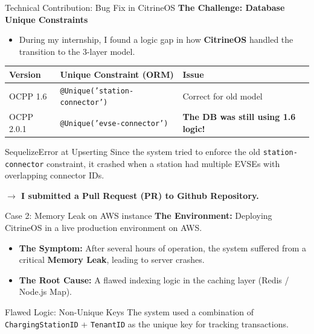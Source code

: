 \documentclass[11pt]{beamer}
\begin{document}
\begin{frame}{Technical Contribution: Bug Fix in CitrineOS}
    \textbf{The Challenge: Database Unique Constraints}
    \begin{itemize}
        \item During my internship, I found a logic gap in how \textbf{CitrineOS} handled the transition to the 3-layer model.
    \end{itemize}

    \begin{table}[]
        \small
        \begin{tabular}{l|l|l}
        \textbf{Version} & \textbf{Unique Constraint (ORM)} & \textbf{Issue} \\ \hline
        OCPP 1.6 & \texttt{@Unique('station-connector')} & Correct for old model \\
        OCPP 2.0.1 & \texttt{@Unique('evse-connector')} & \textbf{The DB was still using 1.6 logic!} \\
        \end{tabular}
    \end{table}

    \begin{alertblock}{SequelizeError at Upserting}
        Since the system tried to enforce the old \texttt{station-connector} constraint, it crashed when a station had multiple EVSEs with overlapping connector IDs.
    \end{alertblock}
    
    \centering
    \textbf{$\rightarrow$ I submitted a Pull Request (PR) to Github Repository.}
\end{frame}


\begin{frame}{Case 2: Memory Leak on AWS instance}
    \textbf{The Environment:} Deploying CitrineOS in a live production environment on AWS.
    \begin{itemize}
        \item \textbf{The Symptom:} After several hours of operation, the system suffered from a critical \textbf{Memory Leak}, leading to server crashes.
        \item \textbf{The Root Cause:} A flawed indexing logic in the caching layer (Redis / Node.js Map).
    \end{itemize}

    \begin{alertblock}{Flawed Logic: Non-Unique Keys}
        The system used a combination of \texttt{ChargingStationID} + \texttt{TenantID} as the unique key for tracking transactions.
    \end{alertblock}
\end{frame}
\end{document}
